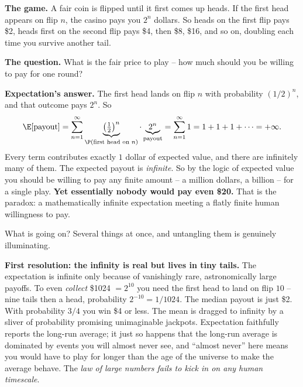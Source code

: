 \begin{paradoxbox}
\textbf{The game.} A fair coin is flipped until it first comes up heads. If the
first head appears on flip $n$, the casino pays you $2^n$ dollars. So heads on the
first flip pays \$2, heads first on the second flip pays \$4, then \$8, \$16, and
so on, doubling each time you survive another tail.

\textbf{The question.} What is the fair price to play -- how much should you be
willing to pay for one round?

\textbf{Expectation's answer.} The first head lands on flip $n$ with probability
$(1/2)^n$, and that outcome pays $2^n$. So
\[
  \E[\text{payout}] = \sum_{n=1}^{\infty} \underbrace{\left(\tfrac12\right)^{n}}_{\P(\text{first head on } n)}
  \cdot \underbrace{2^{n}}_{\text{payout}}
  = \sum_{n=1}^{\infty} 1 = 1 + 1 + 1 + \cdots = +\infty.
\]
Every term contributes exactly $1$ dollar of expected value, and there are
infinitely many of them. The expected payout is \emph{infinite}. So by the
logic of expected value you should be willing to pay any finite amount -- a
million dollars, a billion -- for a single play. \textbf{Yet essentially nobody
would pay even \$20.} That is the paradox: a mathematically infinite expectation
meeting a flatly finite human willingness to pay.
\end{paradoxbox}

What is going on? Several things at once, and untangling them is genuinely
illuminating.

\begin{happeningbox}
\textbf{First resolution: the infinity is real but lives in tiny tails.} The
expectation is infinite only because of vanishingly rare, astronomically large
payoffs. To even \emph{collect} \$1024 $= 2^{10}$ you need the first head to land
on flip $10$ -- nine tails then a head, probability $2^{-10} = 1/1024$. The median
payout is just \$2. With probability $3/4$ you win \$4 or
less. The mean is dragged to infinity by a sliver of probability promising
unimaginable jackpots. Expectation faithfully reports the long-run average; it
just so happens that the long-run average is dominated by events you will almost
never see, and ``almost never'' here means you would have to play for longer than
the age of the universe to make the average behave. The \emph{law of large
numbers fails to kick in on any human timescale}.
\end{happeningbox}

